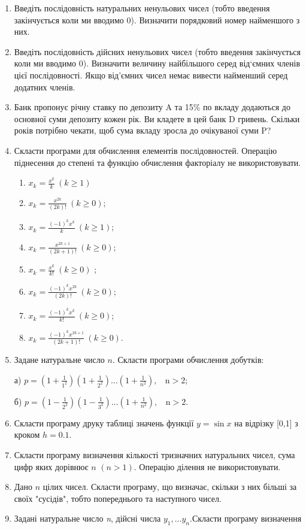 \documentclass[a5paper,titlepage,openany,twoside,draft]{book_unv}%
\makeatletter
\newcommand{\xslalph}[1]{\expandafter\@xslalph\csname c@#1\endcsname}
\newcommand{\@xslalph}[1]{%
    \ifcase#1\or а\or б\or в\or г\or д\or e\or є\or ж\or з\or i%
    \or й\or к\or л\or м\or н\or о\or п\or р\or с\or т%
    \or у\or ф\or х\or ц\or ч\or ш\or ю\or я\or аа\or бб\or вв%
    \else\@ctrerr\fi%
}
\makeatother
\begin{document}
\begin{enumerate}
\item
  Введіть послідовність натуральних ненульових чисел (тобто введення
  закінчується коли ми вводимо 0). Визначити порядковий номер найменшого
  з них.
\item
  Введіть послідовність дійсних ненульових чисел (тобто введення
  закінчується коли ми вводимо 0). Визначити величину найбільшого серед
  від`ємних членів цієї послідовності. Якщо від'ємних чисел немає
  вивести найменший серед додатних членів.
\item
  Банк пропонує річну ставку по депозиту A та 15\% по вкладу додаються
  до основної суми депозиту кожен рік. Ви кладете в цей банк D гривень.
  Скільки років потрібно чекати, щоб сума вкладу зросла до очікуваної
  суми P?
\item
  Скласти програми для обчислення елементів послідовностей. Операцію
  піднесення до степені та функцію обчислення факторіалу не
  використовувати.
\begin{enumerate}[label=\xslalph*)]
\item
\(x_{k} = \frac{x^{k}}{k}\ (k \geq 1)\) 
\item
\(x_{k} = \frac{x^{2k}}{(2k)!}\ (k \geq 0)\);
\item \(x_{k} = \frac{( - 1)^{k}x^{k}}{k}\ (k \geq 1)\); 
\item
\(x_{k} = \frac{x^{2k + 1}}{(2k + 1)!}\ (k \geq 0)\);
\item \(x_{k} = \frac{x^{k}}{k!}\ (k \geq 0)\) ;
\item \(x_{k} = \frac{(-1)^{k}x^{2k}}{(2k)!}\ (k \geq 0)\);
\item \(x_{k} = \frac{(-1)^{k}x^{k}}{k!}\ (k \geq 0)\); 
\item \(x_{k} = \frac{(-1)^{k}x^{2k + 1}}{(2k + 1)!}\ (k \geq  0)\).
 \end{enumerate}

\item
  Задане натуральне число \(n\). Скласти програми обчислення добутків:

а)
\(p = \left( 1 + \frac{1}{1^{2}} \right)\left( 1 + \frac{1}{2^{2}} \right)\ldots\left( 1 + \frac{1}{n^{2}} \right),\mathrm{\ \ \ \ n > 2};\)

б)
\(p = \left( 1 - \frac{1}{2^{2}} \right)\left( 1 - \frac{1}{3^{2}} \right)\ldots\left( 1 + \frac{1}{n^{2}} \right),\mathrm{\ \ \ \ n > 2.}\)

\item
  Скласти програму друку таблиці значень функції \(y = \sin x\) на
  відрізку {[}0,1{]} з кроком \(h = 0.1\).
\item
  Скласти програму визначення кількості тризначних натуральних чисел,
  сума цифр яких дорівнює \(n\) \((n > 1)\). Операцію ділення не
  використовувати.
\item
  Дано \(n\) цілих чисел. Скласти програму, що визначає, скільки з
  них більші за своїх "сусідів", тобто попереднього та наступного чисел.
\item
  Задані натуральне число \emph{n}, дійсні числа
  \(y_{1},\ldots y_{n}.\)Скласти програму визначення


\end{enumerate}
\end{document}
